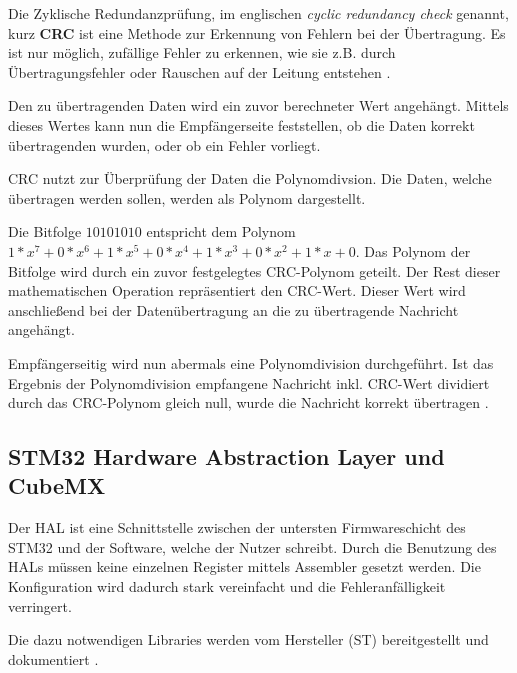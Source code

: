 Die Zyklische Redundanzprüfung, im englischen \textit{cyclic redundancy check} genannt, kurz \textbf{CRC} ist eine Methode zur Erkennung von Fehlern bei 
der Übertragung. Es ist nur möglich, zufällige Fehler zu erkennen, wie sie z.B. durch Übertragungsfehler oder Rauschen auf der Leitung entstehen \citep{IK_VL}.

\smallskip

Den zu übertragenden Daten wird ein zuvor berechneter Wert angehängt. Mittels dieses Wertes kann nun die Empfängerseite feststellen, ob die Daten korrekt übertragenden
wurden, oder ob ein Fehler vorliegt. 

\smallskip

CRC nutzt zur Überprüfung der Daten die Polynomdivsion. Die Daten, welche übertragen werden sollen, werden als Polynom dargestellt.

\smallskip

Die Bitfolge \begin{math}
    10101010
\end{math}  entspricht dem Polynom \begin{math}
    1*x^7+0*x^6+1*x^5+0*x^4+1*x^3+0*x^2+1*x+0
\end{math}.
Das Polynom der Bitfolge wird durch ein zuvor festgelegtes CRC-Polynom geteilt. Der Rest dieser mathematischen Operation repräsentiert den CRC-Wert. Dieser Wert
wird anschließend bei der Datenübertragung an die zu übertragende Nachricht angehängt.

\smallskip

Empfängerseitig wird nun abermals eine Polynomdivision durchgeführt. Ist das Ergebnis der Polynomdivision empfangene Nachricht inkl. CRC-Wert dividiert durch das
CRC-Polynom gleich null, wurde die Nachricht korrekt übertragen \citep{IK_VL}.


\subsection{STM32 Hardware Abstraction Layer und CubeMX}

Der \ac{HAL} ist eine Schnittstelle zwischen der untersten Firmwareschicht des STM32 und der Software, welche der Nutzer schreibt. Durch die Benutzung des
\acp{HAL} müssen keine einzelnen Register mittels Assembler gesetzt werden. Die Konfiguration wird dadurch stark vereinfacht und die Fehleranfälligkeit verringert.

\smallskip

Die dazu notwendigen Libraries werden vom Hersteller (ST) bereitgestellt und dokumentiert \citep{HAL_Description}. 

